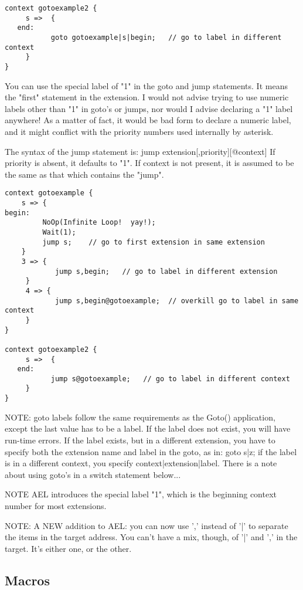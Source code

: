 {\begin{verbatim}
context gotoexample2 {
     s =>  {
   end: 
           goto gotoexample|s|begin;   // go to label in different context
     }
}
\end{verbatim}

You can use the special label of "1" in the goto and jump
statements. It means the "first" statement in the extension. I would
not advise trying to use numeric labels other than "1" in goto's or
jumps, nor would I advise declaring a "1" label anywhere! As a matter
of fact, it would be bad form to declare a numeric label, and it might
conflict with the priority numbers used internally by asterisk.

The syntax of the jump statement is: jump
extension[,priority][@context] If priority is absent, it defaults to
"1". If context is not present, it is assumed to be the same as that
which contains the "jump".

\begin{verbatim}
context gotoexample {
    s => {
begin:
         NoOp(Infinite Loop!  yay!);
         Wait(1);
         jump s;    // go to first extension in same extension
    }
    3 => {
            jump s,begin;   // go to label in different extension
     }
     4 => {
            jump s,begin@gotoexample;  // overkill go to label in same context
     }
}

context gotoexample2 {
     s =>  {
   end: 
           jump s@gotoexample;   // go to label in different context
     }
}
\end{verbatim}

NOTE: goto labels follow the same requirements as the Goto()
      application, except the last value has to be a label. If the
      label does not exist, you will have run-time errors. If the
      label exists, but in a different extension, you have to specify
      both the extension name and label in the goto, as in: goto s|z;
      if the label is in a different context, you specify
      context|extension|label. There is a note about using goto's in a
      switch statement below...

NOTE  AEL introduces the special label "1", which is the beginning
      context number for most extensions.

NOTE: A NEW addition to AEL: you can now use ',' instead of '|' to 
      separate the items in the target address. You can't have a mix,
      though, of '|' and ',' in the target. It's either one, or the other.




\subsection{Macros}

}
